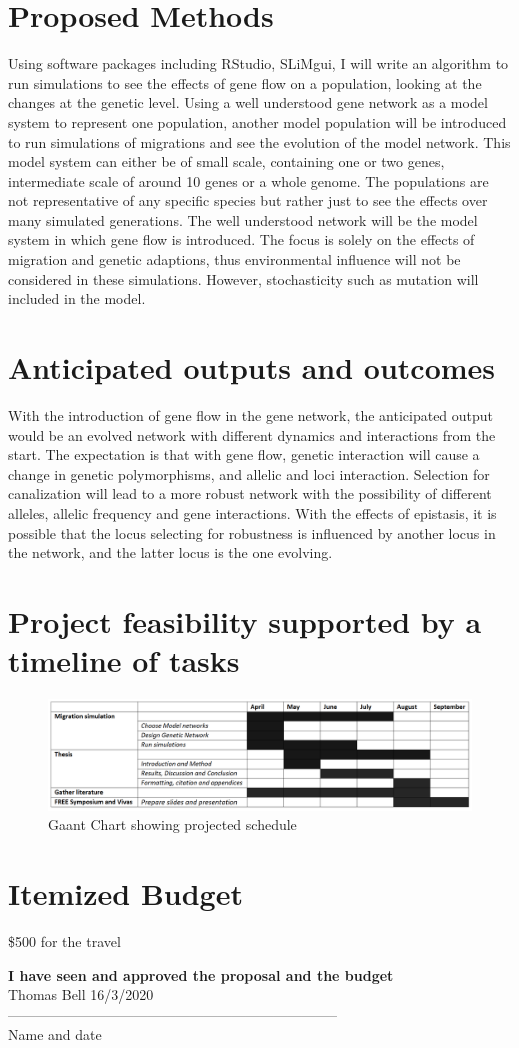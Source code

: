 \documentclass[11pt]{article}
\begin{document}
\section{Proposed Methods}
Using software packages including RStudio, SLiMgui, I will write an algorithm to run simulations to see the effects of gene flow on a population, looking at the changes at the genetic level. Using a well understood gene network as a model system to represent one population, another model population will be introduced to run simulations of migrations and see the evolution of the model network. This model system can either be of small scale, containing one or two genes, intermediate scale of around 10 genes or a whole genome. The populations are not representative of any specific species but rather just to see the effects over many simulated generations.  The well understood network will be the model system in which gene flow is introduced. The focus is solely on the effects of migration and genetic adaptions, thus environmental influence will not be considered in these simulations. However, stochasticity such as mutation will included in the model.

\section{Anticipated outputs and outcomes}
With the introduction of gene flow in the gene network, the anticipated output would be an evolved network with different dynamics and interactions from the start. The expectation is that with gene flow, genetic interaction will cause a change in genetic polymorphisms, and allelic and loci interaction. Selection for canalization will lead to a more robust network with the possibility of different alleles, allelic frequency and gene interactions. With the effects of epistasis, it is possible that the locus selecting for robustness is influenced by another locus in the network, and the latter locus is the one evolving.

\section{Project feasibility supported by a timeline of tasks}
\begin{figure}[h!]
\centering
\includegraphics[scale=0.35]{Gantt_chart.jpg}
\caption{Gaant Chart showing projected schedule}
\label{tab:Gantt Chart}
\end{figure}

\section{Itemized Budget}
\$500 for the travel




\newpage

\textbf{I have seen and approved the proposal and the budget}\\
Thomas Bell   16/3/2020\\
-----------------------------------------------------------------------\\
Name and date
\end{document}

